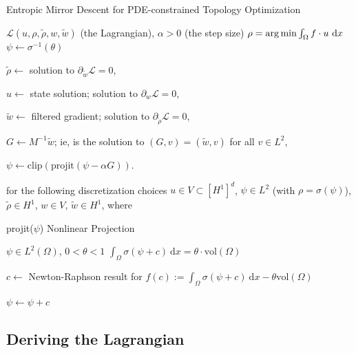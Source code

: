 \begin{algorithm}
    \caption{Entropic Mirror Descent for PDE-constrained Topology Optimization}\label{alg:EMD}
    \begin{algorithmic}
    \Require $\mathcal{L}(u, \rho, \tilde{\rho}, w, \tilde{w})$ (the Lagrangian), $\alpha > 0$ (the step size)
    \Ensure $\rho = \operatorname*{arg\,min} \int_\Omega f \cdot u \ \mathrm{d}x$
    \State $\psi \gets \sigma^{-1}(\theta)$ 

        $\tilde{\rho} \gets$ solution to $\partial_{\tilde{w}} \mathcal{L} = 0$, 

        $u \gets$ state solution; solution to $\partial_{w} \mathcal{L} = 0$, 

        $\tilde{w} \gets$ filtered gradient; solution to $\partial_{\tilde{\rho}} \mathcal{L} = 0$,

        $G \gets M^{-1} \tilde{w}$; ie, is the solution to $(G,v) = (\tilde{w}, v)$ for all $v \in L^2$,

        $\psi \gets \text{clip}(\text{projit}(\psi - \alpha G))$. 

    \EndWhile
    \end{algorithmic}
\end{algorithm}
for the following discretization choices $u \in V \subset [H^1]^d$, $\psi \in L^2$ (with $\rho = \sigma(\psi)$),
$\tilde{\rho} \in H^1$, $w \in V$, $\tilde{w} \in H^1$, where
\begin{algorithm}
    \caption{projit($\psi$) Nonlinear Projection}
    \begin{algorithmic}
        \Require $\psi \in L^2(\Omega)$, $0 < \theta < 1$
        \Ensure $\int_{\Omega} \sigma(\psi + c)\ \mathrm{d}x = \theta \cdot \text{vol}(\Omega)$

        $c \gets$ Newton-Raphson result for $f(c) := \int_\Omega \sigma(\psi + c)\ \mathrm{d}x - \theta \text{vol}(\Omega)$
        
        $\psi \gets \psi + c$ 
    \end{algorithmic}
\end{algorithm}
\subsection{Deriving the Lagrangian}

